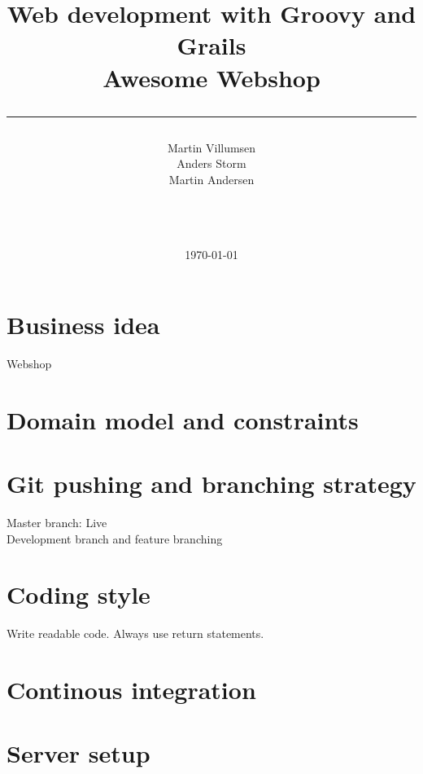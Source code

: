 \documentclass[a4paper,10pt]{article}
\title{Web development with Groovy and Grails\\ Awesome Webshop \\\rule{10cm}{0.5mm}}
\author{Martin Villumsen \\ Anders Storm \\Martin Andersen \\\rule{5.5cm}{0.5mm}\\}
\date{\today}
\begin{document}
\maketitle
\newpage

\tableofcontents
\newpage

\section{Business idea}
Webshop
\section{Domain model and constraints}
\section{Git pushing and branching strategy}
Master branch: Live\\
Development branch and feature branching
\section{Coding style}
Write readable code. Always use return statements.
\section{Continous integration}

\section{Server setup}
\end{document}

